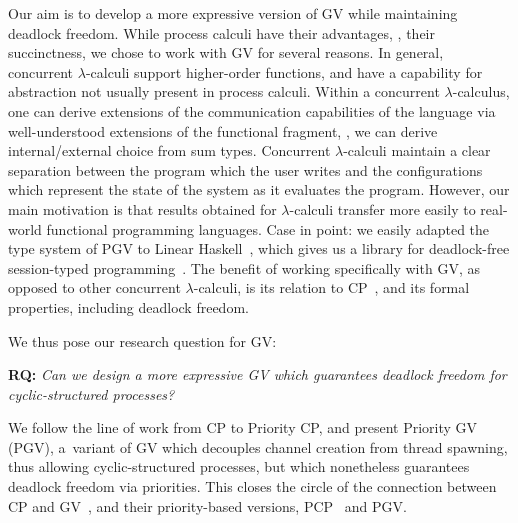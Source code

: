Our aim is to develop a more expressive version of GV while maintaining deadlock freedom. While process calculi have their advantages, \eg, their succinctness, we chose to work with GV for several reasons. In general, concurrent $\lambda$-calculi support higher-order functions, and have a capability for abstraction not usually present in process calculi. Within a concurrent $\lambda$-calculus, one can derive extensions of the communication capabilities of the language via well-understood extensions of the functional fragment, \eg, we can derive internal/external choice from sum types. Concurrent $\lambda$-calculi maintain a clear separation between the program which the user writes and the configurations which represent the state of the system as it evaluates the program. However, our main motivation is that results obtained for $\lambda$-calculi transfer more easily to real-world functional programming languages. Case in point: we easily adapted the type system of PGV to Linear Haskell~\cite{bernardyboespflug18}, which gives us a library for deadlock-free session-typed programming~\cite{kokkedardha21hs}.
The benefit of working specifically with GV, as opposed to other concurrent $\lambda$-calculi, is its relation to CP~\cite{wadler14}, and its formal properties, including deadlock freedom.

We thus pose our research question for GV:

\vspace{1em}
  \textbf{RQ:}
  \emph{Can we design a more expressive GV which guarantees deadlock freedom for cyclic-structured processes?}
\vspace{1em}

We follow the line of work from CP to Priority CP, and present Priority GV (PGV), a~variant of GV which decouples channel creation from thread spawning, thus allowing cyclic-structured processes, but which nonetheless guarantees deadlock freedom via priorities. This closes the circle of the connection between CP and GV~\cite{wadler14}, and their priority-based versions, PCP~\cite{dardhagay18extended} and PGV.


